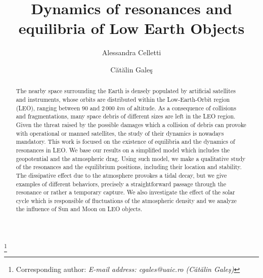\documentclass[12pt,reqno]{amsart}
\numberwithin{equation}{section}
\begin{document}
\title[Dynamics of resonances and equilibria of Low Earth Objects]
{Dynamics of resonances and equilibria of Low Earth Objects}



\author[A. Celletti]{Alessandra Celletti}

\address{
Department of Mathematics, University of Rome Tor Vergata, Via della Ricerca Scientifica 1,
00133 Rome (Italy)}



\author[C. Gale\c s]{C\u at\u alin Gale\c s}

\address{
Department of Mathematics, Al. I. Cuza University, Bd. Carol I 11,
700506 Iasi (Romania)}


\thanks{Corresponding author: \sl E-mail address: \rm cgales@uaic.ro (C\u at\u alin Gale\c s)}



\baselineskip=18pt              %








\begin{abstract}
The nearby space surrounding the Earth is densely populated by
artificial satellites and instruments, whose orbits are
distributed within the Low-Earth-Orbit region (LEO), ranging
between 90 and 2\,000 $km$ of altitude. As a consequence of
collisions and fragmentations, many space debris of different
sizes are left in the LEO region. Given the threat raised by the
possible damages which a collision of debris can provoke with
operational or manned satellites, the study of their dynamics is
nowadays mandatory. This work is focused on the existence of
equilibria and the dynamics of resonances in LEO. We base our results on a simplified
model which includes the geopotential and the atmospheric drag.
Using such model, we make a qualitative study of the
resonances and the equilibrium positions, including their location
and stability. The dissipative effect due to the atmosphere
provokes a tidal decay, but we give examples of different
behaviors, precisely a straightforward passage through the
resonance or rather a temporary capture. We also investigate the
effect of the solar cycle which is responsible of fluctuations of
the atmospheric density and we analyze the influence of Sun and
Moon on LEO objects.
\end{abstract}
\end{document}
